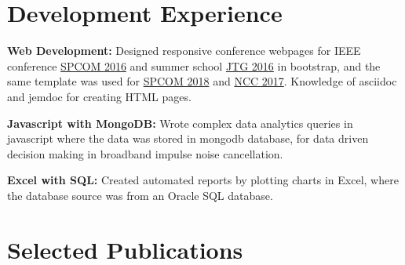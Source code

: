 \documentclass[10pt]{article}
\begin{document}
\section*{Development Experience}
\begin{shortlist}

\item {\bf Web Development:} 
Designed responsive conference webpages for IEEE conference \href{http://www.ece.iisc.ernet.in/~spcom/2016/}{SPCOM 2016} and summer school \href{http://www.ece.iisc.ernet.in/~jtg/2016/}{JTG 2016} in bootstrap, and the same template was used for \href{http://www.ece.iisc.ernet.in/~spcom/2018/}{SPCOM 2018} and \href{http://www.ee.iitm.ac.in/ncc2017/}{NCC 2017}. 
Knowledge of asciidoc and jemdoc for creating HTML pages.  

\item {\bf Javascript with MongoDB:} 
Wrote complex data analytics queries in javascript where the data was stored in mongodb database, 
for data driven decision making in broadband impulse noise cancellation.
 
\item {\bf Excel with SQL:} 
Created automated reports by plotting charts in Excel, where the database source was from an Oracle SQL database. 

\end{shortlist}



\section*{Selected Publications}
\end{document}
